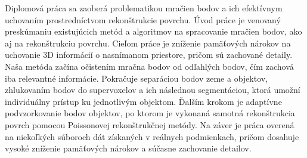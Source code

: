 Diplomová práca sa zaoberá problematikou mračien bodov a ich efektívnym uchovaním prostredníctvom rekonštrukcie povrchu. Úvod práce je venovaný preskúmaniu existujúcich metód a algoritmov na spracovanie mračien bodov, ako aj na rekonštrukciu povrchu. Cieľom práce je zníženie pamäťových nárokov na uchovanie 3D informácií o nasnímanom priestore, pričom sú zachované detaily. Naša metóda začína očistením mračna bodov od odľahlých bodov, čím zachová iba relevantné informácie. Pokračuje separáciou bodov zeme a objektov, zhlukovaním bodov do supervoxelov a ich následnou segmentáciou, ktorá umožní individuálny prístup ku jednotlivým objektom. Ďalším krokom je adaptívne podvzorkovanie bodov objektov, po ktorom je vykonaná samotná rekonštrukcia povrch pomocou Poissonovej rekonštrukčnej metódy. Na záver je práca overená na niekoľkých súboroch dát získaných v reálnych podmienkach, pričom dosahuje vysoké zníženie pamäťových nárokov a súčasne zachovanie detailov. 